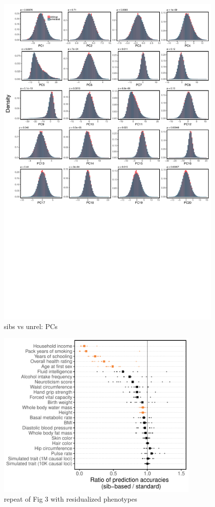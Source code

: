 \documentclass[hidelinks, 12pt]{article}
\begin{document}
\begin{figure}[h!]
\centering
\includegraphics[width=\textwidth]{./supp_figures/sibs_unrel_compare2.pdf}
\caption{sibs vs unrel: PCs}
\end{figure}

\begin{figure}[h!]
\centering
\includegraphics[width=10cm]{./supp_figures/fig3_panelA_SI.pdf}
\caption{repeat of Fig 3 with residualized phenotypes}
\end{figure}
\end{document}
